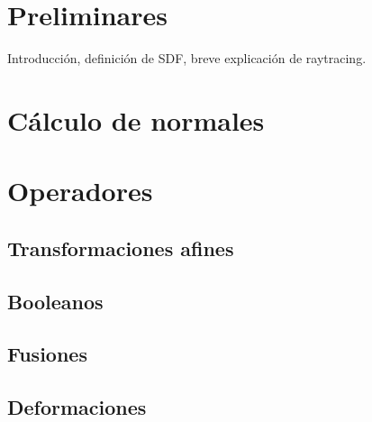 
\section{Preliminares}
Introducción, definición de SDF, breve explicación de raytracing. 
\section{Cálculo de normales}
\section{Operadores}
\subsection{Transformaciones afines}
\subsection{Booleanos}
\subsection{Fusiones}
\subsection{Deformaciones}